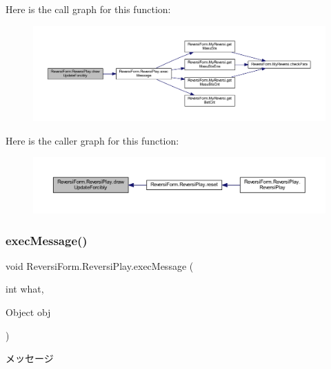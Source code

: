Here is the call graph for this function\+:
\nopagebreak
\begin{figure}[H]
\begin{center}
\leavevmode
\includegraphics[width=350pt]{class_reversi_form_1_1_reversi_play_accc1d553ba6a6c2a5f0c58316b40a183_cgraph}
\end{center}
\end{figure}
Here is the caller graph for this function\+:
\nopagebreak
\begin{figure}[H]
\begin{center}
\leavevmode
\includegraphics[width=350pt]{class_reversi_form_1_1_reversi_play_accc1d553ba6a6c2a5f0c58316b40a183_icgraph}
\end{center}
\end{figure}
\mbox{\label{class_reversi_form_1_1_reversi_play_aa7cf1089065bff85997d057210312ae8}} 
\subsubsection{\texorpdfstring{exec\+Message()}{execMessage()}}
{\footnotesize\ttfamily void Reversi\+Form.\+Reversi\+Play.\+exec\+Message (\begin{DoxyParamCaption}\item[{int}]{what,  }\item[{Object}]{obj }\end{DoxyParamCaption})\hspace{0.3cm}{\ttfamily [private]}}



メッセージ 


